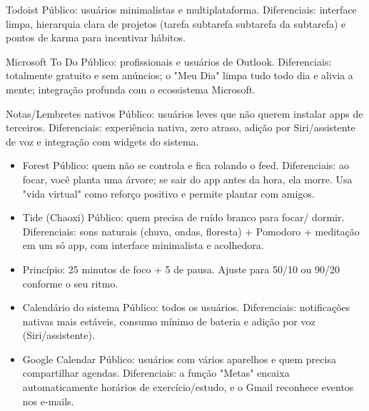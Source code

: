 Todoist Público: usuários minimalistas e multiplataforma. Diferenciais: interface limpa, hierarquia clara de projetos (tarefa subtarefa subtarefa da subtarefa) e pontos de karma para incentivar hábitos.

Microsoft To Do Público: profissionais e usuários de Outlook. Diferenciais: totalmente gratuito e sem anúncios; o "Meu Dia" limpa tudo todo dia e alivia a mente; integração profunda com o ecossistema Microsoft.

Notas/Lembretes nativos Público: usuários leves que não querem instalar apps de terceiros. Diferenciais: experiência nativa, zero atraso, adição por Siri/assistente de voz e integração com widgets do sistema.


\begin{itemize}
  \item Forest Público: quem não se controla e fica rolando o feed. Diferenciais: ao focar, você planta uma árvore; se sair do app antes da hora, ela morre. Usa "vida virtual" como reforço positivo e permite plantar com amigos.
  \item Tide (Chaoxi) Público: quem precisa de ruído branco para focar/ dormir. Diferenciais: sons naturais (chuva, ondas, floresta) + Pomodoro + meditação em um só app, com interface minimalista e acolhedora.
  \item Princípio: 25 minutos de foco + 5 de pausa. Ajuste para 50/10 ou 90/20 conforme o seu ritmo.
\end{itemize}


\begin{itemize}
  \item Calendário do sistema Público: todos os usuários. Diferenciais: notificações nativas mais estáveis, consumo mínimo de bateria e adição por voz (Siri/assistente).
  \item Google Calendar Público: usuários com vários aparelhos e quem precisa compartilhar agendas. Diferenciais: a função "Metas" encaixa automaticamente horários de exercício/estudo, e o Gmail reconhece eventos nos e-mails.
\end{itemize}


